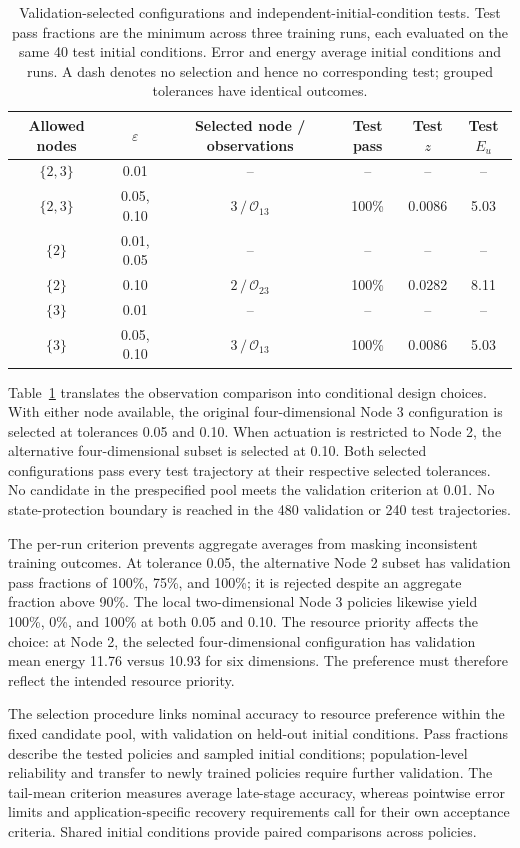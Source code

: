 \begin{table}[pos=!t,width=\textwidth]
\centering
\caption{Validation-selected configurations and independent-initial-condition tests. Test pass fractions are the minimum across three training runs, each evaluated on the same 40 test initial conditions. Error and energy average initial conditions and runs. A dash denotes no selection and hence no corresponding test; grouped tolerances have identical outcomes.}
\label{tab:configuration_selection}
\small
\begin{tabular}{cccccc}
\toprule
Allowed nodes & $\varepsilon$ & Selected node / observations & Test pass & Test $z$ & Test $E_u$\\
\midrule
$\{2,3\}$ & 0.01 & -- & -- & -- & --\\
$\{2,3\}$ & 0.05, 0.10 & $3\,/\,\mathcal O_{13}$ & 100\% & 0.0086 & 5.03\\
$\{2\}$ & 0.01, 0.05 & -- & -- & -- & --\\
$\{2\}$ & 0.10 & $2\,/\,\mathcal O_{23}$ & 100\% & 0.0282 & 8.11\\
$\{3\}$ & 0.01 & -- & -- & -- & --\\
$\{3\}$ & 0.05, 0.10 & $3\,/\,\mathcal O_{13}$ & 100\% & 0.0086 & 5.03\\
\bottomrule
\end{tabular}
\end{table}

Table~\ref{tab:configuration_selection} translates the observation comparison into conditional design choices. With either node available, the original four-dimensional Node 3 configuration is selected at tolerances 0.05 and 0.10. When actuation is restricted to Node 2, the alternative four-dimensional subset is selected at 0.10. Both selected configurations pass every test trajectory at their respective selected tolerances. No candidate in the prespecified pool meets the validation criterion at 0.01. No state-protection boundary is reached in the 480 validation or 240 test trajectories.

The per-run criterion prevents aggregate averages from masking inconsistent training outcomes. At tolerance 0.05, the alternative Node 2 subset has validation pass fractions of 100\%, 75\%, and 100\%; it is rejected despite an aggregate fraction above 90\%. The local two-dimensional Node 3 policies likewise yield 100\%, 0\%, and 100\% at both 0.05 and 0.10. The resource priority affects the choice: at Node 2, the selected four-dimensional configuration has validation mean energy 11.76 versus 10.93 for six dimensions. The preference must therefore reflect the intended resource priority.

The selection procedure links nominal accuracy to resource preference within the fixed candidate pool, with validation on held-out initial conditions. Pass fractions describe the tested policies and sampled initial conditions; population-level reliability and transfer to newly trained policies require further validation. The tail-mean criterion measures average late-stage accuracy, whereas pointwise error limits and application-specific recovery requirements call for their own acceptance criteria. Shared initial conditions provide paired comparisons across policies.


